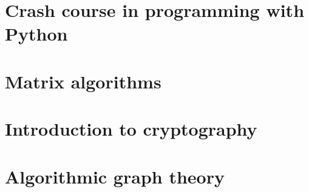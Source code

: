 \documentclass[openright]{memoir}
\theoremstyle{plain}
\theoremstyle{definition}
\theoremstyle{remark}
\newcommand{\lecture}[1]{\newpage}
\newcommand{\xto}[1]{\xrightarrow{#1}}
\begin{document}
\clearpage
\pagestyle{headings}
\tableofcontents

\mainmatter
\pagestyle{ruled}
\part{Crash course in programming with Python}



\lecture{m3380-lec-01}
\lecture{m3380-lec-02}
\lecture{m3380-lec-03}
\lecture{m3380-lec-04}

\part{Matrix algorithms}
\lecture{m3380-lec-05}
\lecture{m3380-lec-06}
\lecture{m3380-lec-07}
\lecture{m3380-lec-08}

\part{Introduction to cryptography}
\lecture{m3380-lec-09}
\lecture{m3380-lec-10}
\lecture{m3380-lec-11}

\part{Algorithmic graph theory}
\lecture{m3380-lec-12}
\lecture{m3380-lec-13}
\lecture{m3380-lec-14}
\lecture{m3380-lec-15}
\end{document}
